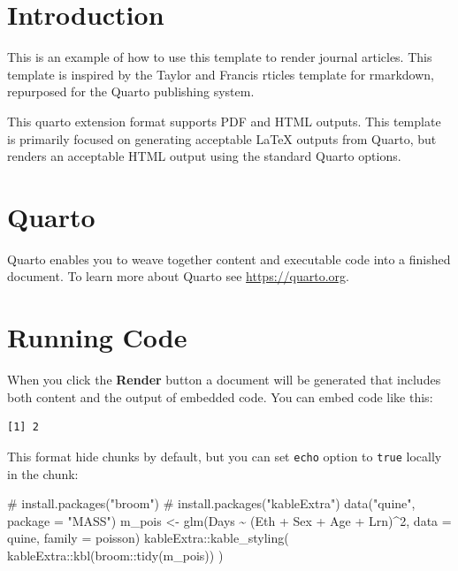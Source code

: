 \documentclass[
]{interact}
\newenvironment{Shaded}{\begin{snugshade}}{\end{snugshade}}
\newcommand{\AttributeTok}[1]{\textcolor[rgb]{0.40,0.45,0.13}{#1}}
\newcommand{\CommentTok}[1]{\textcolor[rgb]{0.37,0.37,0.37}{#1}}
\newcommand{\DecValTok}[1]{\textcolor[rgb]{0.68,0.00,0.00}{#1}}
\newcommand{\FunctionTok}[1]{\textcolor[rgb]{0.28,0.35,0.67}{#1}}
\newcommand{\NormalTok}[1]{\textcolor[rgb]{0.00,0.23,0.31}{#1}}
\newcommand{\OtherTok}[1]{\textcolor[rgb]{0.00,0.23,0.31}{#1}}
\newcommand{\SpecialCharTok}[1]{\textcolor[rgb]{0.37,0.37,0.37}{#1}}
\newcommand{\StringTok}[1]{\textcolor[rgb]{0.13,0.47,0.30}{#1}}
\begin{document}
\hypertarget{sec-intro}{%
\section{Introduction}\label{sec-intro}}

This is an example of how to use this template to render journal
articles. This template is inspired by the Taylor and Francis rticles
template for rmarkdown, repurposed for the Quarto publishing system.

This quarto extension format supports PDF and HTML outputs. This
template is primarily focused on generating acceptable {\LaTeX} outputs
from Quarto, but renders an acceptable HTML output using the standard
Quarto options.

\hypertarget{quarto}{%
\section{Quarto}\label{quarto}}

Quarto enables you to weave together content and executable code into a
finished document. To learn more about Quarto see
\url{https://quarto.org}.

\hypertarget{running-code}{%
\section{Running Code}\label{running-code}}

When you click the \textbf{Render} button a document will be generated
that includes both content and the output of embedded code. You can
embed code like this:

\begin{verbatim}
[1] 2
\end{verbatim}

This format hide chunks by default, but you can set \texttt{echo} option
to \texttt{true} locally in the chunk:

\begin{Shaded}
\begin{Highlighting}[]
\CommentTok{\# install.packages("broom")}
\CommentTok{\# install.packages("kableExtra")}
\FunctionTok{data}\NormalTok{(}\StringTok{"quine"}\NormalTok{, }\AttributeTok{package =} \StringTok{"MASS"}\NormalTok{)}
\NormalTok{m\_pois }\OtherTok{\textless{}{-}} \FunctionTok{glm}\NormalTok{(Days }\SpecialCharTok{\textasciitilde{}}\NormalTok{ (Eth }\SpecialCharTok{+}\NormalTok{ Sex }\SpecialCharTok{+}\NormalTok{ Age }\SpecialCharTok{+}\NormalTok{ Lrn)}\SpecialCharTok{\^{}}\DecValTok{2}\NormalTok{, }\AttributeTok{data =}\NormalTok{ quine, }\AttributeTok{family =}\NormalTok{ poisson)}
\NormalTok{kableExtra}\SpecialCharTok{::}\FunctionTok{kable\_styling}\NormalTok{(}
\NormalTok{  kableExtra}\SpecialCharTok{::}\FunctionTok{kbl}\NormalTok{(broom}\SpecialCharTok{::}\FunctionTok{tidy}\NormalTok{(m\_pois))}
\NormalTok{)}
\end{Highlighting}
\end{Shaded}
\end{document}

